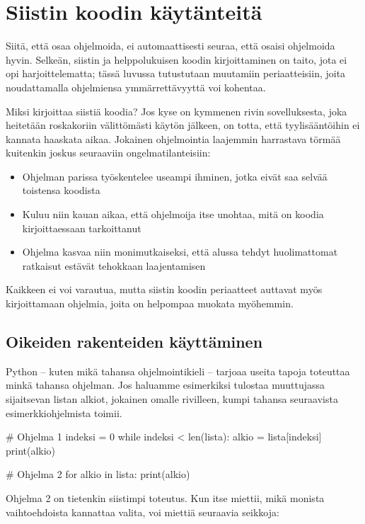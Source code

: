\chapter{Siistin koodin käytänteitä}

Siitä, että osaa ohjelmoida, ei automaattisesti seuraa, että osaisi ohjelmoida hyvin. Selkeän, siistin ja helppolukuisen koodin kirjoittaminen on taito, jota ei opi harjoittelematta; tässä luvussa tutustutaan muutamiin periaatteisiin, joita noudattamalla ohjelmiensa ymmärrettävyyttä voi kohentaa.

Miksi kirjoittaa siistiä koodia? Jos kyse on kymmenen rivin sovelluksesta, joka heitetään roskakoriin välittömästi käytön jälkeen, on totta, että tyylisääntöihin ei kannata haaskata aikaa. Jokainen ohjelmointia laajemmin harrastava törmää kuitenkin joskus seuraaviin ongelmatilanteisiin:

\begin{itemize}
\item Ohjelman parissa työskentelee useampi ihminen, jotka eivät saa selvää toistensa koodista
\item Kuluu niin kauan aikaa, että ohjelmoija itse unohtaa, mitä on koodia kirjoittaessaan tarkoittanut
\item Ohjelma kasvaa niin monimutkaiseksi, että alussa tehdyt huolimattomat ratkaisut estävät tehokkaan laajentamisen
\end{itemize}

Kaikkeen ei voi varautua, mutta siistin koodin periaatteet auttavat myös kirjoittamaan ohjelmia, joita on helpompaa muokata myöhemmin.

\section{Oikeiden rakenteiden käyttäminen}

Python -- kuten mikä tahansa ohjelmointikieli -- tarjoaa useita tapoja toteuttaa minkä tahansa ohjelman. Jos haluamme esimerkiksi tulostaa muuttujassa  sijaitsevan listan alkiot, jokainen omalle rivilleen, kumpi tahansa seuraavista esimerkkiohjelmista toimii.

\begin{python}
# Ohjelma 1
indeksi = 0
while indeksi < len(lista):
	alkio = lista[indeksi]
	print(alkio)

# Ohjelma 2
for alkio in lista:
	print(alkio)
\end{python}

Ohjelma 2 on tietenkin siistimpi toteutus. Kun itse miettii, mikä monista vaihtoehdoista kannattaa valita, voi miettiä seuraavia seikkoja:

